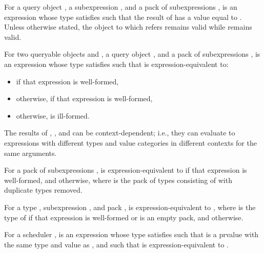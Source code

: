 \pnum
For a query object ,
a subexpression , and
a pack of subexpressions ,
 is an expression 
whose type satisfies 
such that the result of  has
a value equal to .
Unless otherwise stated,
the object to which  refers remains valid
while  remains valid.

\pnum
For two queryable objects  and ,
a query object , and
a pack of subexpressions ,
 is an expression 
whose type satisfies 
such that  is expression-equivalent to:
\begin{itemize}
\item
{} if that expression is well-formed,
\item
otherwise,  if that expression is well-formed,
\item
otherwise,  is ill-formed.
\end{itemize}

\pnum
The results of , , and 
can be context-dependent;
i.e., they can evaluate to expressions
with different types and value categories
in different contexts for the same arguments.

\pnum
For a pack of subexpressions ,
 is expression-equivalent to
if that expression is well-formed, and
 otherwise,
where  is the pack of types consisting of
 with duplicate types removed.

\pnum
For a type , subexpression , and pack ,
is expression-equivalent to ,
where  is
the type of 
if that expression is well-formed or  is an empty pack, and
 otherwise.

\pnum
For a scheduler ,
 is an expression 
whose type satisfies 
such that  is a prvalue
with the same type and value as , and
such that  is expression-equivalent to
.

